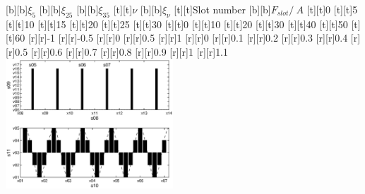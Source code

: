 %    
%
%
\begin{psfrags}%
\psfragscanon%
%
[b][b]{$\xi_{5}$}%
[b][b]{$\xi_{25}$}%
[b][b]{$\xi_{35}$}%
[t][t]{$\nu$}%
[b][b]{$\xi_{\nu}$}%
[t][t]{Slot number}%
[b][b]{$F_{slot}/\SI{}{A}$}%
%
[t][t]{0}%
[t][t]{5}%
[t][t]{10}%
[t][t]{15}%
[t][t]{20}%
[t][t]{25}%
[t][t]{30}%
[t][t]{0}%
[t][t]{10}%
[t][t]{20}%
[t][t]{30}%
[t][t]{40}%
[t][t]{50}%
[t][t]{60}%
%
[r][r]{-1}%
[r][r]{-0.5}%
[r][r]{0}%
[r][r]{0.5}%
[r][r]{1}%
[r][r]{0}%
[r][r]{0.1}%
[r][r]{0.2}%
[r][r]{0.3}%
[r][r]{0.4}%
[r][r]{0.5}%
[r][r]{0.6}%
[r][r]{0.7}%
[r][r]{0.8}%
[r][r]{0.9}%
[r][r]{1}%
[r][r]{1.1}%
%
\includegraphics[width=0.47\textwidth]{figs/f_Qs_30_p_5_1.eps}
\end{psfrags}%
%

